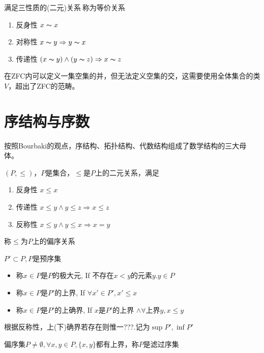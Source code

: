 \begin{Def}[等价关系]
    满足三性质的(二元)关系$~$称为等价关系
    \begin{enumerate}
        \item 反身性 $x \thicksim x$
        \item 对称性 $x \thicksim y\Rightarrow y \thicksim x$
        \item 传递性 $(x \thicksim y)\wedge (y\thicksim z)\Rightarrow x\thicksim z$ 
    \end{enumerate}
\end{Def}
在ZFC内可以定义一集空集的并，但无法定义空集的交，这需要使用全体集合的类$V$，超出了ZFC的范畴。

\section{序结构与序数}
按照Bourbaki的观点，序结构、拓扑结构、代数结构组成了数学结构的三大母体。
\begin{Def}[偏序关系]
    $(P,\leq)$，$P$是集合，$\leq $是$P$上的二元关系，满足
    \begin{enumerate}
        \item 反身性 $x\leq x$
        \item 传递性 $x\leq y \wedge y\leq z\Rightarrow x\leq z$
        \item 反称性 $x\leq y \wedge y \leq x\Rightarrow x=y$
    \end{enumerate}
    称$\leq $为$P$上的偏序关系
\end{Def}

\begin{Def}
    $P' \subset P,P$是预序集
    \begin{itemize}
        \item 称$x\in P$是$P$的极大元, If 不存在$x<y$的元素$y. y\in P$
        \item 称$x\in P$是$P'$的上界, If $\forall x' \in P', x' \leq x$
        \item 称$x\in P$是$P'$的上确界, If $x$是$P'$的上界 $\wedge \forall $上界$y,x\leq y$
    \end{itemize}    
    根据反称性，上(下)确界若存在则惟一???.记为$\sup{P'},\inf{P'}$
\end{Def}

\begin{Def}[滤过序集]
    偏序集$P \neq \emptyset, \forall x,y \in P,\{x,y\}$都有上界，称$P$是滤过序集
\end{Def}

